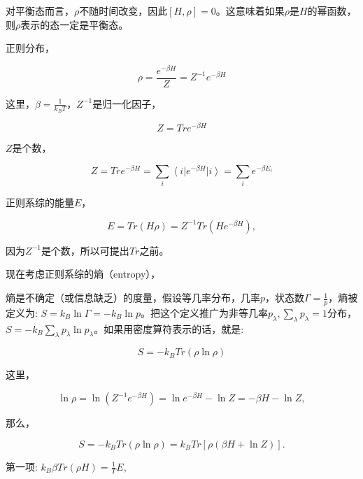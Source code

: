 对平衡态而言，$\rho$不随时间改变，因此$[H, \rho]=0$。这意味着如果$\rho$是$H$的幂函数，则$\rho$表示的态一定是平衡态。

正则分布，

\begin{equation}\label{canonical distribution}
\rho = \frac{e^{-\beta H}}{Z} = Z^{-1} e^{-\beta H}
\end{equation}

这里，$\beta = \frac{1}{k_B T}$，$Z^{-1}$是归一化因子，

\begin{equation*}
Z=Tr e^{-\beta H}
\end{equation*}

$Z$是个数，

\begin{equation*}
Z = Tr e^{-\beta H} = \sum_i \left\langle i \right| e^{-\beta H}
\left| i \right\rangle = \sum\limits_i e^{-\beta E_i}
\end{equation*}

正则系综的能量$E$，

\begin{equation*}
E = Tr (H \rho) = Z^{-1} Tr (H e^{-\beta H}),
\end{equation*}

因为$Z^{-1}$是个数，所以可提出$Tr$之前。

现在考虑正则系综的熵（entropy），

熵是不确定（或信息缺乏）的度量，假设等几率分布，几率$p$，状态数$\Gamma = \frac{1}{p}$，熵被定义为: $S = k_B \ln \Gamma = - k_B \ln p$。把这个定义推广为非等几率${p_{\lambda}}, \sum_{\lambda}
p_{\lambda}=1$分布，$S = -k_B \sum\limits_{\lambda} p_{\lambda}\ln
p_{\lambda}$。如果用密度算符表示的话，就是:

\begin{equation}\label{definition of entropy}
S = - k_B Tr (\rho \ln \rho)
\end{equation}

这里，

\begin{equation*}
\ln \rho = \ln ( Z^{-1} e^{-\beta H} ) = \ln e^{-\beta H} - \ln Z =
-\beta H - \ln Z,
\end{equation*}

那么，

\begin{equation*}
S = - k_B Tr (\rho \ln \rho) = k_B Tr [ \rho (\beta H + \ln Z) ].
\end{equation*}

第一项: $k_B \beta Tr (\rho H) = \frac{1}{T} E$,

